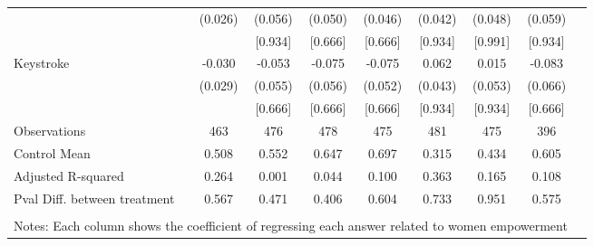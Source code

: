 \begin{tabular}{l*{8}{c}}
                    &     (0.026)   &     (0.056)   &     (0.050)   &     (0.046)   &     (0.042)   &     (0.048)   &     (0.059)   \\
                    &               &     [0.934]   &     [0.666]   &     [0.666]   &     [0.934]   &     [0.991]   &     [0.934]   \\
Keystroke           &      -0.030   &      -0.053   &      -0.075   &      -0.075   &       0.062   &       0.015   &      -0.083   \\
                    &     (0.029)   &     (0.055)   &     (0.056)   &     (0.052)   &     (0.043)   &     (0.053)   &     (0.066)   \\
                    &               &     [0.666]   &     [0.666]   &     [0.666]   &     [0.934]   &     [0.934]   &     [0.666]   \\
\hline
Observations        &         463   &         476   &         478   &         475   &         481   &         475   &         396   \\
Control Mean        &       0.508   &       0.552   &       0.647   &       0.697   &       0.315   &       0.434   &       0.605   \\
Adjusted R-squared  &       0.264   &       0.001   &       0.044   &       0.100   &       0.363   &       0.165   &       0.108   \\
Pval Diff. between treatment&       0.567   &       0.471   &       0.406   &       0.604   &       0.733   &       0.951   &       0.575   \\
\hline \\ \multicolumn{8}{l}{\tiny Notes: Each column shows the coefficient of regressing each answer related to women empowerment
}
\end{tabular}
